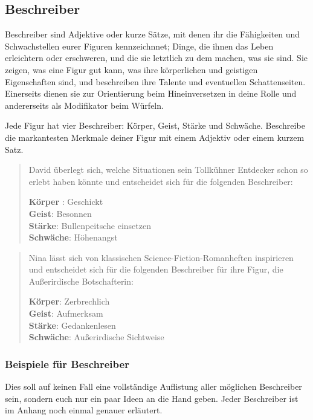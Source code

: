 \documentclass[]{article}
\begin{document}
\subsection{Beschreiber}\label{beschreiber}

Beschreiber sind Adjektive oder kurze Sätze, mit denen ihr die
Fähigkeiten und Schwachstellen eurer Figuren kennzeichnnet; Dinge, die
ihnen das Leben erleichtern oder erschweren, und die sie letztlich zu
dem machen, was sie sind. Sie zeigen, was eine Figur gut kann, was ihre
körperlichen und geistigen Eigenschaften sind, und beschreiben ihre
Talente und eventuellen Schattenseiten. Einerseits dienen sie zur
Orientierung beim Hineinversetzen in deine Rolle und andererseits als
Modifikator beim Würfeln.

Jede Figur hat vier Beschreiber: Körper, Geist, Stärke und Schwäche.
Beschreibe die markantesten Merkmale deiner Figur mit einem Adjektiv
oder einem kurzem Satz.

\begin{quote}
David überlegt sich, welche Situationen sein Tollkühner Entdecker schon
so erlebt haben könnte und entscheidet sich für die folgenden
Beschreiber:

\textbf{Körper} : Geschickt\\
\textbf{Geist}: Besonnen\\
\textbf{Stärke}: Bullenpeitsche einsetzen\\
\textbf{Schwäche}: Höhenangst
\end{quote}

\begin{quote}
Nina lässt sich von klassischen Science-Fiction-Romanheften inspirieren
und entscheidet sich für die folgenden Beschreiber für ihre Figur, die
Außerirdische Botschafterin:

\textbf{Körper}: Zerbrechlich\\
\textbf{Geist}: Aufmerksam\\
\textbf{Stärke}: Gedankenlesen\\
\textbf{Schwäche}: Außerirdische Sichtweise
\end{quote}

\subsubsection{Beispiele für
Beschreiber}\label{beispiele-fuxfcr-beschreiber}

Dies soll auf keinen Fall eine vollständige Auflistung aller möglichen
Beschreiber sein, sondern euch nur ein paar Ideen an die Hand geben.
Jeder Beschreiber ist im Anhang noch einmal genauer erläutert.
\end{document}
